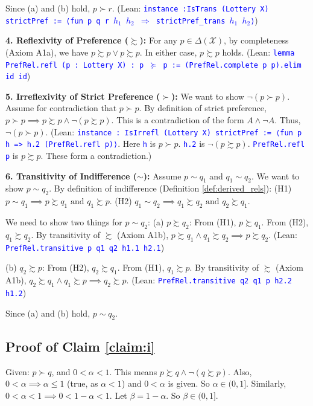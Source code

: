 \documentclass{article}
\theoremstyle{definition}
\newcommand{\X}{\mathcal{X}}
\newcommand{\tactic}[1]{\textcolor{blue}{\texttt{#1}}}
\newcommand{\DeltaX}{\Delta(\X)} %
\newcommand{\pref}{\succsim} %
\newcommand{\strictpref}{\succ} %
\newcommand{\indiff}{\sim} %
\begin{document}
Since (a) and (b) hold, $p \strictpref r$.
(Lean: \tactic{instance :IsTrans (Lottery X) strictPref := ⟨fun p q r $h_1$ $h_2$ $\Rightarrow$ strictPref\_trans $h_1$ $h_2$⟩})

\textbf{4. Reflexivity of Preference ($\pref$):}
For any $p \in \DeltaX$, by completeness (Axiom A1a), we have $p \pref p \lor p \pref p$. In either case, $p \pref p$ holds.
(Lean: \tactic{lemma PrefRel.refl (p : Lottery X) : p $\succeq$ p := (PrefRel.complete p p).elim id id})

\textbf{5. Irreflexivity of Strict Preference ($\strictpref$):}
We want to show $\lnot(p \strictpref p)$.
Assume for contradiction that $p \strictpref p$.
By definition of strict preference, $p \strictpref p \implies p \pref p \land \lnot(p \pref p)$.
This is a contradiction of the form $A \land \lnot A$.
Thus, $\lnot(p \strictpref p)$.
(Lean: \tactic{instance : IsIrrefl (Lottery X) strictPref := ⟨fun p h => h.2 (PrefRel.refl p)⟩}. Here \tactic{h} is $p \strictpref p$. \tactic{h.2} is $\lnot(p \pref p)$. \tactic{PrefRel.refl p} is $p \pref p$. These form a contradiction.)

\textbf{6. Transitivity of Indifference ($\indiff$):}
Assume $p \indiff q_1$ and $q_1 \indiff q_2$. We want to show $p \indiff q_2$.
By definition of indifference (Definition \ref{def:derived_rels}):
(H1) $p \indiff q_1 \implies p \pref q_1 \text{ and } q_1 \pref p$.
(H2) $q_1 \indiff q_2 \implies q_1 \pref q_2 \text{ and } q_2 \pref q_1$.

We need to show two things for $p \indiff q_2$:
(a) $p \pref q_2$:
From (H1), $p \pref q_1$. From (H2), $q_1 \pref q_2$.
By transitivity of $\pref$ (Axiom A1b), $p \pref q_1 \land q_1 \pref q_2 \implies p \pref q_2$.
(Lean: \tactic{PrefRel.transitive p q1 q2 h1.1 h2.1})

(b) $q_2 \pref p$:
From (H2), $q_2 \pref q_1$. From (H1), $q_1 \pref p$.
By transitivity of $\pref$ (Axiom A1b), $q_2 \pref q_1 \land q_1 \pref p \implies q_2 \pref p$.
(Lean: \tactic{PrefRel.transitive q2 q1 p h2.2 h1.2})

Since (a) and (b) hold, $p \indiff q_2$.

\subsection{Proof of Claim \ref{claim:i}}\label{proof:claim:i}
Given: $p \strictpref q$, and $0 < \alpha < 1$.
This means $p \pref q \land \lnot(q \pref p)$.
Also, $0 < \alpha \implies \alpha \le 1$ (true, as $\alpha < 1$) and $0 < \alpha$ is given. So $\alpha \in (0,1]$.
Similarly, $0 < \alpha < 1 \implies 0 < 1-\alpha < 1$. Let $\beta = 1-\alpha$. So $\beta \in (0,1]$.
\end{document}
